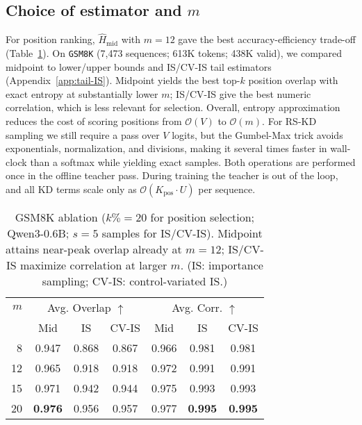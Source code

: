 \documentclass[11pt]{article}
\begin{document}
\subsection{Choice of estimator and $m$}
For position ranking, $\widehat{H}_{\text{mid}}$ with $m{=}12$ gave the best accuracy-efficiency trade-off (Table~\ref{tab:entropy-ablation}).
On \texttt{GSM8K} (7{,}473 sequences; 613K tokens; 438K valid), we compared midpoint to lower/upper bounds and IS/CV-IS tail estimators (Appendix~\ref{app:tail-IS}).
Midpoint yields the best top-$k$ position overlap with exact entropy at substantially lower $m$; IS/CV-IS give the best numeric correlation, which is less relevant for selection.
Overall, entropy approximation reduces the cost of scoring positions from $\mathcal{O}(V)$ to $\mathcal{O}(m)$.
For RS-KD sampling we still require a pass over $V$ logits, but the Gumbel-Max trick avoids exponentials, normalization, and divisions, making it several times faster in wall-clock than a softmax while yielding exact samples.
Both operations are performed once in the offline teacher pass.
During training the teacher is out of the loop, and all KD terms scale only as $\mathcal{O}(K_{\text{pos}}\!\cdot\!U)$ per sequence.

\vspace{-0.5em}
\begin{table}[h]
	\centering
	\small
	\setlength{\tabcolsep}{6pt}
	\begin{tabular}{rcccccc}
		\toprule
		$m$ & \multicolumn{3}{c}{Avg. Overlap $\uparrow$} & \multicolumn{3}{c}{Avg. Corr. $\uparrow$                                                   } \\
		\cmidrule(lr){2-4}\cmidrule(lr){5-7}
		    & Mid                                         & IS                                        & CV-IS & Mid   & IS             & CV-IS          \\
		\midrule
		8   & 0.947                                       & 0.868                                     & 0.867 & 0.966 & 0.981          & 0.981          \\
		12  & 0.965                                       & 0.918                                     & 0.918 & 0.972 & 0.991          & 0.991          \\
		15  & 0.971                                       & 0.942                                     & 0.944 & 0.975 & 0.993          & 0.993          \\
		20  & \textbf{0.976}                              & 0.956                                     & 0.957 & 0.977 & \textbf{0.995} & \textbf{0.995} \\
		\bottomrule
	\end{tabular}
	\caption{GSM8K ablation ($k\%{=}20$ for position selection; Qwen3-0.6B; $s{=}5$ samples for IS/CV-IS). Midpoint attains near-peak overlap already at $m{=}12$; IS/CV-IS maximize correlation at larger $m$. (IS: importance sampling; CV-IS: control-variated IS.)}
	\label{tab:entropy-ablation}
\end{table}
\vspace{-0.75em}
\end{document}
